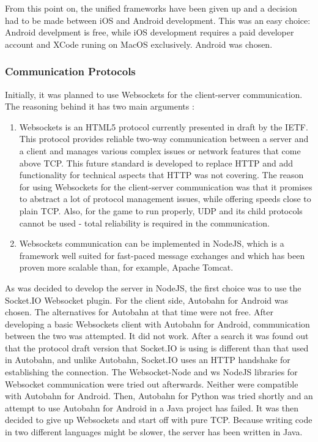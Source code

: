 \documentclass{article}
\begin{document}
From this point on, the unified frameworks have been given up and a decision had
to be made between iOS and Android development. This was an easy choice: Android
develpment is free, while iOS development requires a paid developer account and
XCode runing on MacOS exclusively. Android was chosen.


\subsubsection{Communication Protocols}

Initially, it was planned to use Websockets for the client-server communication.
The reasoning behind it has two main arguments : 
\begin{enumerate}
  \item Websockets is an HTML5 protocol currently presented in draft by the
  IETF. This protocol provides reliable two-way communication between a server
  and a client and manages various complex issues or network features that come
  above TCP. This future standard is developed to replace HTTP and add
  functionality for technical aspects that HTTP was not covering. The reason for
  using Websockets for the client-server communication was that it promises to
  abstract a lot of protocol management issues, while offering speeds close to
  plain TCP. Also, for the game to run properly, UDP and its child protocols
  cannot be used - total reliability is required in the communication. 
  
  \item Websockets communication can be implemented in NodeJS, which is a
  framework well suited for fast-paced message exchanges and which has been
  proven more scalable than, for example, Apache Tomcat.
\end{enumerate}

As was decided to develop the server in NodeJS, the first choice was to use the
Socket.IO Websocket plugin. For the client side, Autobahn for Android was
chosen. The alternatives for Autobahn at that time were not free. After
developing a basic Websockets client with Autobahn for Android, communication
between the two was attempted. It did not work. After a search it was found out
that the protocol draft version that Socket.IO is using is different than that
used in Autobahn, and unlike Autobahn, Socket.IO uses an HTTP handshake for
establishing the connection. The Websocket-Node and ws NodeJS libraries for
Websocket communication were tried out afterwards. Neither were compatible with
Autobahn for Android. Then, Autobahn for Python was tried shortly and an
attempt to use Autobahn for Android in a Java project has failed. It was then
decided to give up Websockets and start off with pure TCP. Because writing code
in two different languages might be slower, the server has been written in Java.
\end{document}
